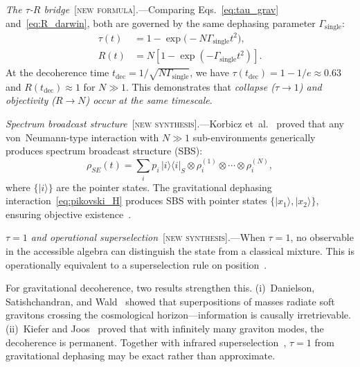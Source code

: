 \documentclass[prl,twocolumn,superscriptaddress,longbibliography,floatfix]{revtex4-2}
\newcommand{\ket}[1]{|#1\rangle}
\newcommand{\op}[2]{|#1\rangle\langle#2|}
\newcommand{\tauasym}{\tau}
\begin{document}
\emph{The $\tauasym$-$R$ bridge}~[\textsc{new formula}].---Comparing
Eqs.~\eqref{eq:tau_grav} and~\eqref{eq:R_darwin}, both are governed
by the same dephasing parameter $\Gamma_{\mathrm{single}}$:
\begin{equation}
\boxed{
\begin{aligned}
\tauasym(t) &= 1 - \exp\!\big(-N\Gamma_{\mathrm{single}} t^2\big), \\
R(t) &= N\!\left[1 - \exp(-\Gamma_{\mathrm{single}} t^2)\right].
\end{aligned}
}
\label{eq:tau_R_bridge}
\end{equation}
At the decoherence time $t_{\mathrm{dec}} = 1/\sqrt{N
\Gamma_{\mathrm{single}}}$, we have $\tauasym(t_{\mathrm{dec}})
= 1 - 1/e \approx 0.63$ and
$R(t_{\mathrm{dec}}) \approx 1$ for $N \gg 1$.
This demonstrates that \emph{collapse ($\tauasym \to 1$) and
objectivity ($R \to N$) occur at the same timescale}.

\emph{Spectrum broadcast structure}~[\textsc{new
synthesis}].---Korbicz et~al.~\cite{Korbicz2021} proved that any
von~Neumann-type interaction with $N \gg 1$ sub-environments
generically produces spectrum broadcast structure (SBS):
\begin{equation}
\rho_{SE}(t) = \sum_i p_i\, \op{i}{i}_S \otimes
  \rho^{(1)}_i \otimes \cdots \otimes \rho^{(N)}_i,
\label{eq:SBS}
\end{equation}
where $\{\ket{i}\}$ are the pointer states.  The gravitational
dephasing interaction~\eqref{eq:pikovski_H} produces SBS with
pointer states $\{\ket{x_1}, \ket{x_2}\}$, ensuring objective
existence~\cite{Korbicz2021}.

\emph{$\tauasym = 1$ and operational superselection}~[\textsc{new
synthesis}].---When $\tauasym = 1$, no observable in the accessible
algebra can distinguish the state from a classical mixture.  This is
operationally equivalent to a superselection rule on
position~\cite{BRS2007}.

For gravitational decoherence, two results strengthen this.
(i)~Danielson, Satishchandran, and Wald~\cite{DSW2022} showed
that superpositions of masses radiate soft gravitons crossing the
cosmological horizon---information is causally irretrievable.
(ii)~Kiefer and Joos~\cite{KieferJoos1999} proved that with
infinitely many graviton modes, the decoherence is permanent.
Together with infrared superselection~\cite{Buchholz1986},
$\tauasym = 1$ from gravitational dephasing may be exact rather
than approximate.

\end{document}
